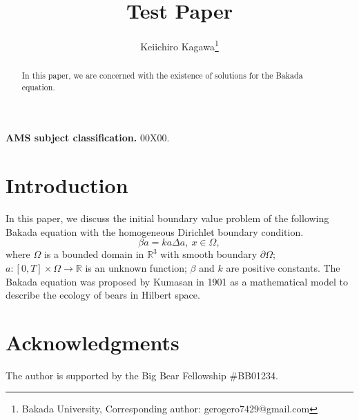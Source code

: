 \documentclass{article}
\title{Test Paper}
\author{Keiichiro Kagawa\thanks{Bakada University, Corresponding author: gerogero7429@gmail.com}}
\newcommand{\Lap}{\Delta}
\begin{document}
\maketitle

\begin{abstract}
  In this paper, we are concerned with the existence of solutions for the Bakada equation.
\end{abstract}

\noindent
  {\bf AMS subject classification.}
  00X00.

\section{Introduction}\indent
  In this paper, we discuss the initial boundary value problem 
  of the following Bakada equation with the homogeneous Dirichlet boundary condition.
  \begin{equation}\label{BE}
    \beta a = ka \Lap a,\ x\in\Omega,
  \end{equation}
  where $\Omega$ is a bounded domain in $\mathbb{R}^3$ with smooth boundary $\partial\Omega$;
  $a:[0, T]\times\Omega\to\mathbb{R}$ is an unknown function;
  $\beta$ and $k$ are positive constants.
    The Bakada equation was proposed by Kumasan \cite{Kumasan} in 1901 
    as a mathematical model to describe the ecology of bears in Hilbert space.

\section*{Acknowledgments}
  The author is supported by the Big Bear Fellowship {\#}BB01234.



\end{document}
